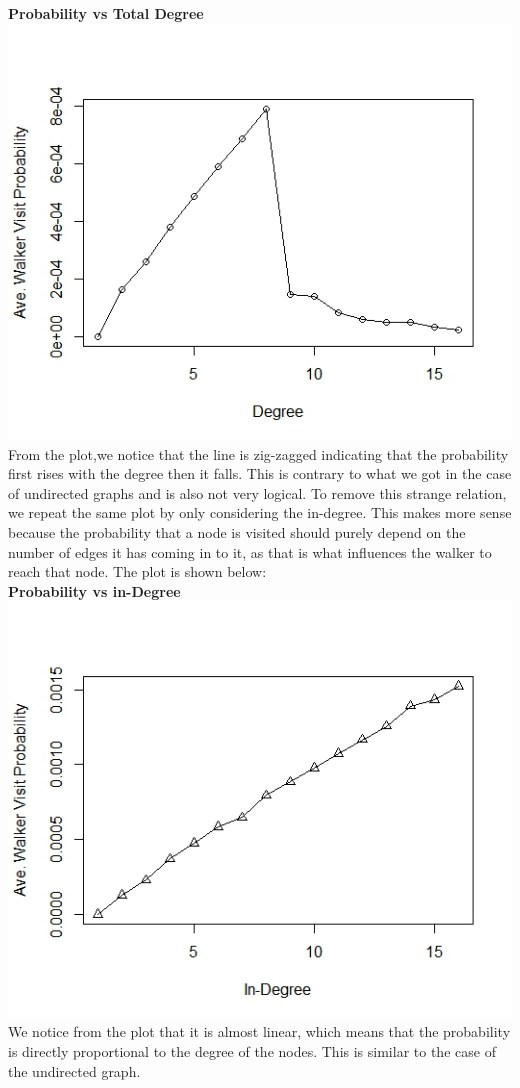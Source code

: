 \documentclass{article}
\begin{document}
\textbf{Probability vs Total Degree}\\
\includegraphics[scale=0.4]{p3d} \\
From the plot,we notice that the line is zig-zagged indicating that the probability
first rises with the degree then it falls. This is contrary to what we got in the case of undirected graphs and is
also not very logical. To remove this strange relation, we repeat the same plot by only considering the in-degree.
This makes more sense because the probability that a node is visited should purely depend on the number of edges
it has coming in to it, as that is what influences the walker to reach that node. The plot is shown below:\\

\textbf{Probability vs in-Degree}\\
\includegraphics[scale=0.4]{p3e} \\
We notice from the plot that it is almost linear, which means that the probability is directly proportional to the 
degree of the nodes. This is similar to the case of the undirected graph.\\
\end{document}
